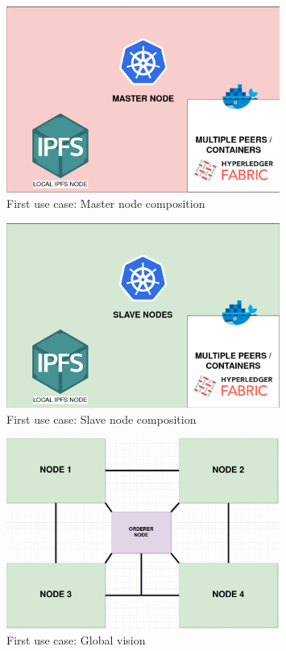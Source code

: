 \begin{figure}[H]
    \centering
    \includegraphics[width=0.8\textwidth]{assets/use-case-1/Master.png} %
    \caption{First use case: Master node composition}
    \label{fig:sample-image} 
\end{figure}

\begin{figure}[H]
    \centering
    \includegraphics[width=0.8\textwidth]{assets/use-case-1/Slave.png} %
    \caption{First use case: Slave node composition}
    \label{fig:sample-image} 
\end{figure}

\begin{figure}[H]
    \centering
    \includegraphics[width=0.8\textwidth]{assets/use-case-1/global-vision.drawio.png} %
    \caption{First use case: Global vision}
    \label{fig:sample-image} 
\end{figure}

